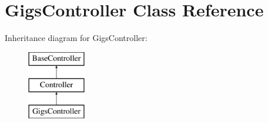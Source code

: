 \hypertarget{class_responsive_1_1_http_1_1_controllers_1_1_gigs_controller}{}\section{Gigs\+Controller Class Reference}
\label{class_responsive_1_1_http_1_1_controllers_1_1_gigs_controller}
Inheritance diagram for Gigs\+Controller\+:\begin{figure}[H]
\begin{center}
\leavevmode
\includegraphics[height=3.000000cm]{class_responsive_1_1_http_1_1_controllers_1_1_gigs_controller}
\end{center}
\end{figure}
